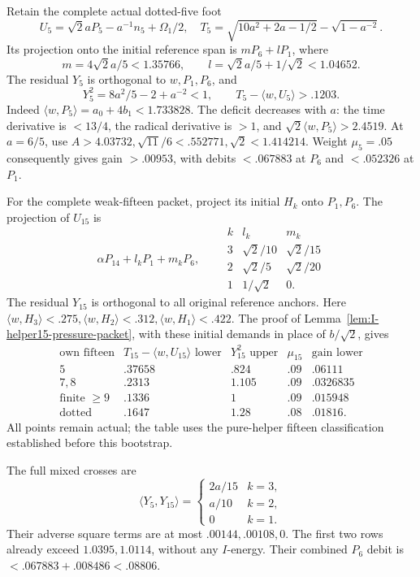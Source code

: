 \documentclass[11pt]{article}
\theoremstyle{definition}
\theoremstyle{remark}
\newcommand{\ip}[2]{\langle #1,#2\rangle}
\begin{document}
Retain the complete actual dotted-five foot
\[
 U_5=\sqrt2aP_5-a^{-1}n_5+\Omega_1/2,\quad
 T_5=\sqrt{10a^2+2a-1/2}-\sqrt{1-a^{-2}}.
\]
Its projection onto the initial reference span is \(mP_6+lP_1\), where
\[
 m=4\sqrt2a/5<1.35766,\qquad
 l=\sqrt2a/5+1/\sqrt2<1.04652.
\]
The residual \(Y_5\) is orthogonal to \(w,P_1,P_6\), and
\[
 Y_5^2=8a^2/5-2+a^{-2}<1,\qquad T_5-\ip w{U_5}>.1203.
\]
Indeed \(\ip w{P_5}=a_0+4b_1<1.733828\). The deficit
decreases with \(a\): the time derivative is \(<13/4\),
the radical derivative is \(>1\), and
\(\sqrt2\ip w{P_5}>2.4519\).
At \(a=6/5\), use
\(A>4.03732,\sqrt{11}/6<.552771,\sqrt2<1.414214\).
Weight \(\mu_5=.05\) consequently gives gain \(>.00953\),
with debits \(<.067883\) at \(P_6\) and \(<.052326\) at \(P_1\).

For the complete weak-fifteen packet, project its initial \(H_k\)
onto \(P_1,P_6\). The projection of \(U_{15}\) is
\[
 \alpha P_{14}+l_kP_1+m_kP_6,\qquad
\begin{array}{c|cc}
k&l_k&m_k\\ \hline
3&\sqrt2/10&\sqrt2/15\\
2&\sqrt2/5&\sqrt2/20\\
1&1/\sqrt2&0 .
\end{array}
\]
The residual \(Y_{15}\) is orthogonal to all original reference
anchors. Here \(\ip w{H_3}<.275,\ip w{H_2}<.312,
\ip w{H_1}<.422\). The proof of
Lemma~\ref{lem:I-helper15-pressure-packet}, with these initial
demands in place of \(b/\sqrt2\), gives
\[
\begin{array}{c|c|c|c|c}
\text{own fifteen}&T_{15}-\ip w{U_{15}}\text{ lower}&
Y_{15}^2\text{ upper}&\mu_{15}&\text{gain lower}\\ \hline
5&.37658&.824&.09&.06111\\
7,8&.2313&1.105&.09&.0326835\\
\text{finite }\ge9&.1336&1&.09&.015948\\
\text{dotted}&.1647&1.28&.08&.01816 .
\end{array}
\]
All points remain actual; the table uses the pure-helper fifteen
classification established before this bootstrap.

The full mixed crosses are
\[
 \ip{Y_5}{Y_{15}}=
 \begin{cases}2a/15&k=3,\\a/10&k=2,\\0&k=1.\end{cases}
\]
Their adverse square terms are at most \(.00144,.00108,0\).
The first two rows already exceed \(1.0395,1.0114\), without
any \(I\)-energy. Their combined \(P_6\) debit is
\(<.067883+.008486<.08806\).
\end{document}
